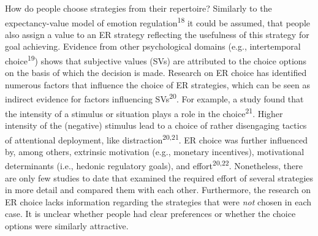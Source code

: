 \documentclass[
  man,floatsintext]{apa6}
\begin{document}
How do people choose strategies from their repertoire?
Similarly to the expectancy-value model of emotion regulation\textsuperscript{18} it could be assumed, that people also assign a value to an ER strategy reflecting the usefulness of this strategy for goal achieving.
Evidence from other psychological domains (e.g., intertemporal choice\textsuperscript{19}) shows that subjective values (SVs) are attributed to the choice options on the basis of which the decision is made.
Research on ER choice has identified numerous factors that influence the choice of ER strategies, which can be seen as indirect evidence for factors influencing SVs\textsuperscript{20}.
For example, a study found that the intensity of a stimulus or situation plays a role in the choice\textsuperscript{21}.
Higher intensity of the (negative) stimulus lead to a choice of rather disengaging tactics of attentional deployment, like distraction\textsuperscript{20,21}.
ER choice was further influenced by, among others, extrinsic motivation (e.g., monetary incentives), motivational determinants (i.e., hedonic regulatory goals), and effort\textsuperscript{20,22}.
Nonetheless, there are only few studies to date that examined the required effort of several strategies in more detail and compared them with each other.
Furthermore, the research on ER choice lacks information regarding the strategies that were \emph{not} chosen in each case.
It is unclear whether people had clear preferences or whether the choice options were similarly attractive.
\end{document}
